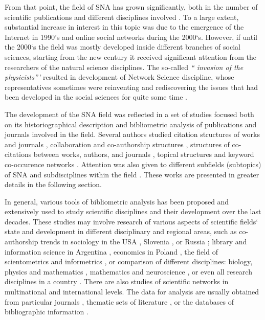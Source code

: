 \documentclass[11pt]{article} %
\begin{document}
From that point, the field of SNA has grown significantly, both in the number of scientific publications and different disciplines involved \citep{SNAinf, borgatti}. To a large extent, substantial increase in interest in this topic was due to the emergence of the Internet in 1990's and online social networks during the 2000`s. However, if until the 2000`s the field was mostly developed inside different branches of social sciences, starting from the new century it received significant attention from the researchers of the natural science disciplines. The so-called \textit{``  invasion of the physicists'''}  \citep{bonacich} resulted in development of Network Science discipline, whose representatives sometimes were reinventing and rediscovering the issues that had been developed in the social sciences for quite some time \citep{SNAdev}.  \medskip 
 
The development of the SNA field was reflected in a set of studies focused both on its historiographical description \citep{SNAdev,SNAdev2} and bibliometric analysis of publications and journals involved in the field. Several authors studied citation structures of works and journals \citep{normSci,leydes,Understand}, collaboration and co-authorship structures \citep{SNAinf, leydes,Understand}, structures of co-citations between works, authors, and journals \citep{brandes}, topical structures and keyword co-occurence networks \citep{leydes,lookingglass}. Attention was also given to different subfields (subtopics) of SNA \citep{central,kejzar, Understand, batagelj2019} and subdisciplines within the field \citep{SNAinf,borgatti,lazer,varga}. These works are presented in greater details in the following section. \medskip 

In general, various tools of bibliometric analysis has been proposed and extensively used to study scientific disciplines and their development over the last decades. These studies may involve research of various aspects of scientific fields` state and development in different disciplinary and regional areas, such as co-authorship trends in sociology in the USA \citep{moody, sociol}, Slovenia \citep{mali}, or Russia \citep{sokolov}; library and information science in Argentina \citep{rodriguez}, economics in Poland \citep{polish}, the field of  scientometrics and informetrics \citep{hou}, or comparison of different disciplines: biology, physics and mathematics \citep{newman1, newman4}, mathematics and neuroscience \citep{Evol}, or even all research disciplines in a country \citep{kroneg,ferligoj,cugmas}. There are also studies of scientific networks in multinational \citep{glaenzel} and international \citep{wagner} levels. The data for analysis are usually obtained from particular journals \citep{conflict}, thematic sets of literature \citep{dna,PeerRew}, or the databases of bibliographic information \citep{kroneg}. \medskip 
\end{document}
